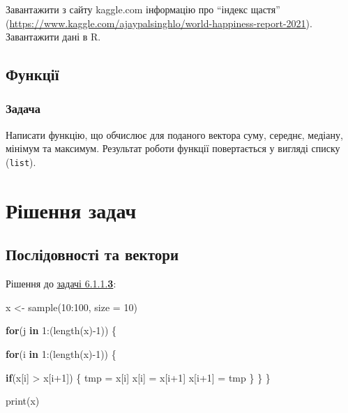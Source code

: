 \documentclass[
]{book}
\newenvironment{Shaded}{\begin{snugshade}}{\end{snugshade}}
\newcommand{\AttributeTok}[1]{\textcolor[rgb]{0.77,0.63,0.00}{#1}}
\newcommand{\ControlFlowTok}[1]{\textcolor[rgb]{0.13,0.29,0.53}{\textbf{#1}}}
\newcommand{\DecValTok}[1]{\textcolor[rgb]{0.00,0.00,0.81}{#1}}
\newcommand{\FunctionTok}[1]{\textcolor[rgb]{0.00,0.00,0.00}{#1}}
\newcommand{\NormalTok}[1]{#1}
\newcommand{\OtherTok}[1]{\textcolor[rgb]{0.56,0.35,0.01}{#1}}
\newcommand{\SpecialCharTok}[1]{\textcolor[rgb]{0.00,0.00,0.00}{#1}}
\begin{document}
Завантажити з сайту kaggle.com інформацію про ``індекс щастя'' (\url{https://www.kaggle.com/ajaypalsinghlo/world-happiness-report-2021}). Завантажити дані в R.

\hypertarget{chapter612}{%
\subsection{Функції}\label{chapter612}}

\hypertarget{task612}{%
\subsubsection{Задача}\label{task612}}

Написати функцію, що обчислює для поданого вектора суму, середнє, медіану, мінімум та максимум. Результат роботи функції повертається у вигляді списку (\texttt{list}).

\hypertarget{chapter62}{%
\section{Рішення задач}\label{chapter62}}

\hypertarget{chapter621}{%
\subsection{Послідовності та вектори}\label{chapter621}}

Рішення до \protect\hyperlink{task6113}{задачі 6.1.1.\textbf{3}}:

\begin{Shaded}
\begin{Highlighting}[]
\NormalTok{x }\OtherTok{\textless{}{-}} \FunctionTok{sample}\NormalTok{(}\DecValTok{10}\SpecialCharTok{:}\DecValTok{100}\NormalTok{, }\AttributeTok{size =} \DecValTok{10}\NormalTok{)}
  
\ControlFlowTok{for}\NormalTok{(j }\ControlFlowTok{in} \DecValTok{1}\SpecialCharTok{:}\NormalTok{(}\FunctionTok{length}\NormalTok{(x)}\SpecialCharTok{{-}}\DecValTok{1}\NormalTok{)) \{}
  
  \ControlFlowTok{for}\NormalTok{(i }\ControlFlowTok{in} \DecValTok{1}\SpecialCharTok{:}\NormalTok{(}\FunctionTok{length}\NormalTok{(x)}\SpecialCharTok{{-}}\DecValTok{1}\NormalTok{)) \{}
    
    \ControlFlowTok{if}\NormalTok{(x[i] }\SpecialCharTok{\textgreater{}}\NormalTok{ x[i}\SpecialCharTok{+}\DecValTok{1}\NormalTok{]) \{}
\NormalTok{      tmp }\OtherTok{=}\NormalTok{ x[i]}
\NormalTok{      x[i] }\OtherTok{=}\NormalTok{ x[i}\SpecialCharTok{+}\DecValTok{1}\NormalTok{]}
\NormalTok{      x[i}\SpecialCharTok{+}\DecValTok{1}\NormalTok{] }\OtherTok{=}\NormalTok{ tmp}
\NormalTok{    \}}
\NormalTok{  \}}
\NormalTok{\}}

\FunctionTok{print}\NormalTok{(x)}
\end{Highlighting}
\end{Shaded}
\end{document}
